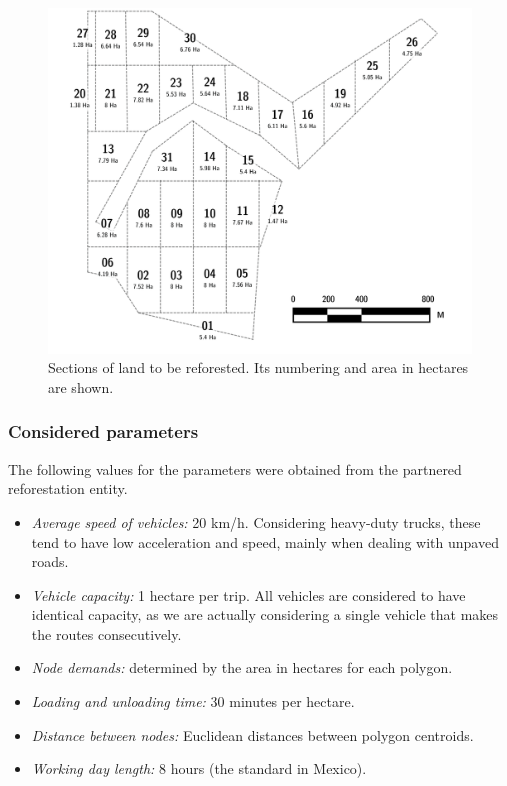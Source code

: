 \documentclass{amsart}
\begin{document}
        \begin{figure}[ht]
            \centering
            \includegraphics[width=0.5\linewidth]{Sources/Field.png}
            \caption{Sections of land to be reforested. Its numbering and area in hectares are shown.}
            \label{fig:tablaDePoligonos}
        \end{figure}
    
    \subsubsection{Considered parameters}
    
    The following values for the parameters were obtained from the partnered reforestation entity.
    
    \begin{itemize}
        \item \textit{Average speed of vehicles:} 20 km/h. Considering heavy-duty trucks, these tend to have low acceleration and speed, mainly when dealing with unpaved roads.
        \item \textit{Vehicle capacity:} 1 hectare per trip. All vehicles are considered to have identical capacity, as we are actually considering a single vehicle that makes the routes consecutively.
        \item \textit{Node demands:} determined by the area in hectares for each polygon.
        \item \textit{Loading and unloading time:} 30 minutes per hectare.
        \item \textit{Distance between nodes:} Euclidean distances between polygon centroids.
        \item \textit{Working day length:} 8 hours (the standard in Mexico).
    \end{itemize}
    
    
\end{document}
